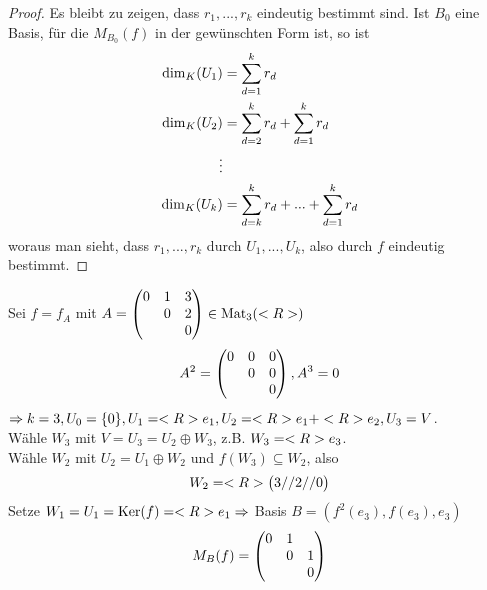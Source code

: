 \begin{proof}
	Es bleibt zu zeigen, dass $r_1,...,r_k$ eindeutig bestimmt sind. Ist $B_0$ eine Basis, für die $M_{B_0}(f)$ in der gewünschten Form ist, so ist 
	\begin{align}
		\dim_K(U_1) &= \sum\limits_{d=1}^k r_d \notag \\
		\dim_K(U_2) &= \sum\limits_{d=2}^k r_d + \sum\limits_{d=1}^k r_d \notag \\
		\vdots \notag \\
		\dim_K(U_k) &= \sum\limits_{d=k}^k r_d + ... + \sum\limits_{d=1}^k r_d\notag 
	\end{align}
	woraus man sieht, dass $r_1,...,r_k$ durch $U_1,...,U_k$, also durch $f$ eindeutig bestimmt.
\end{proof}

\begin{example}
	Sei $f=f_A$ mit $A=\begin{pmatrix}0&1&3\\\;&0&2\\\;&\;&0\end{pmatrix}\in\operatorname{Mat}_3(<R>)$
	\begin{align}
		A^2=\begin{pmatrix}0&0&0\\\;&0&0\\\;&\;&0\end{pmatrix}, A^3=0\notag
	\end{align}
	$\Rightarrow k=3, U_0=\{0\}, U_1=<R> e_1, U_2=<R> e_1+<R> e_2, U_3=V$. \\
	Wähle $W_3$ mit $V=U_3=U_2\oplus W_3$, z.B. $W_3=<R> e_3$. \\
	Wähle $W_2$ mit $U_2=U_1\oplus W_2$ und $f(W_3)\subseteq W_2$, also 
	\begin{align}
		W_2=<R>\begin{pmatrix}3//2//0\end{pmatrix}\notag
	\end{align}
	Setze $W_1=U_1=\operatorname{Ker}(f)=<R> e_1\Rightarrow$ Basis $B=(f^2(e_3),f(e_3),e_3)$
	\begin{align}
		M_B(f)=\begin{pmatrix}0&1&\; \\ \;&0&1\\ \;&\;&0\end{pmatrix}\notag
	\end{align}
\end{example}
